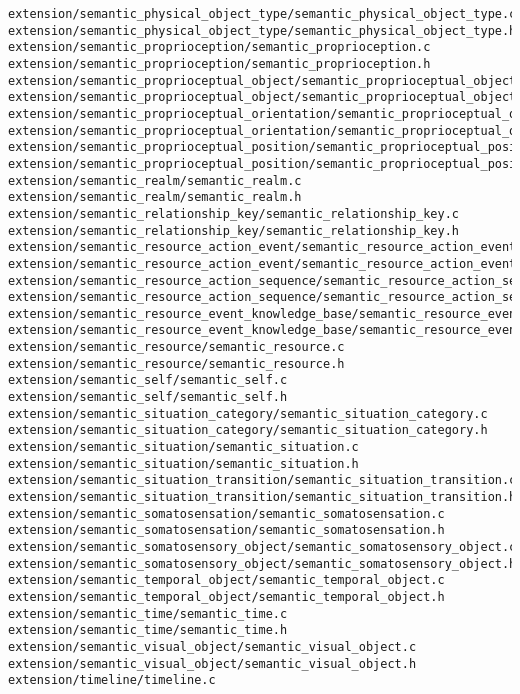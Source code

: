 \begin{lstlisting}
extension/semantic_physical_object_type/semantic_physical_object_type.c
extension/semantic_physical_object_type/semantic_physical_object_type.h
extension/semantic_proprioception/semantic_proprioception.c
extension/semantic_proprioception/semantic_proprioception.h
extension/semantic_proprioceptual_object/semantic_proprioceptual_object.c
extension/semantic_proprioceptual_object/semantic_proprioceptual_object.h
extension/semantic_proprioceptual_orientation/semantic_proprioceptual_orientation.c
extension/semantic_proprioceptual_orientation/semantic_proprioceptual_orientation.h
extension/semantic_proprioceptual_position/semantic_proprioceptual_position.c
extension/semantic_proprioceptual_position/semantic_proprioceptual_position.h
extension/semantic_realm/semantic_realm.c
extension/semantic_realm/semantic_realm.h
extension/semantic_relationship_key/semantic_relationship_key.c
extension/semantic_relationship_key/semantic_relationship_key.h
extension/semantic_resource_action_event/semantic_resource_action_event.c
extension/semantic_resource_action_event/semantic_resource_action_event.h
extension/semantic_resource_action_sequence/semantic_resource_action_sequence.c
extension/semantic_resource_action_sequence/semantic_resource_action_sequence.h
extension/semantic_resource_event_knowledge_base/semantic_resource_event_knowledge_base.c
extension/semantic_resource_event_knowledge_base/semantic_resource_event_knowledge_base.h
extension/semantic_resource/semantic_resource.c
extension/semantic_resource/semantic_resource.h
extension/semantic_self/semantic_self.c
extension/semantic_self/semantic_self.h
extension/semantic_situation_category/semantic_situation_category.c
extension/semantic_situation_category/semantic_situation_category.h
extension/semantic_situation/semantic_situation.c
extension/semantic_situation/semantic_situation.h
extension/semantic_situation_transition/semantic_situation_transition.c
extension/semantic_situation_transition/semantic_situation_transition.h
extension/semantic_somatosensation/semantic_somatosensation.c
extension/semantic_somatosensation/semantic_somatosensation.h
extension/semantic_somatosensory_object/semantic_somatosensory_object.c
extension/semantic_somatosensory_object/semantic_somatosensory_object.h
extension/semantic_temporal_object/semantic_temporal_object.c
extension/semantic_temporal_object/semantic_temporal_object.h
extension/semantic_time/semantic_time.c
extension/semantic_time/semantic_time.h
extension/semantic_visual_object/semantic_visual_object.c
extension/semantic_visual_object/semantic_visual_object.h
extension/timeline/timeline.c

\end{lstlisting}
